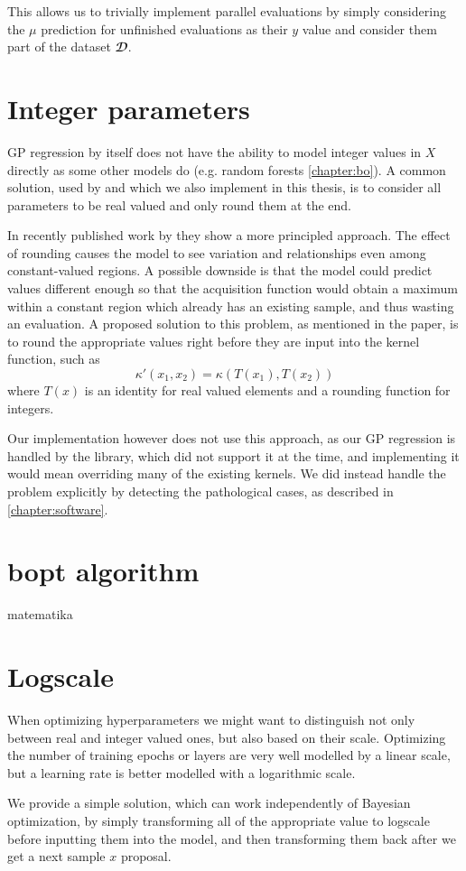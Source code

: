 This allows us to trivially implement parallel evaluations by simply
considering the $μ$ prediction for unfinished evaluations as their $y$ value
and consider them part of the dataset $𝓓$.


\section{Integer parameters}

GP regression by itself does not have the ability to model integer values in $X$ directly as some other models do (e.g. random forests \autoref{chapter:bo}). A common solution, used by \citep{spearmint} and which we also implement in this thesis, is to consider all parameters to be real valued and only round them at the end.

In recently published work by \cite{integer-valued-gp} they show a more principled approach. The effect of rounding causes the model to see variation and relationships even among constant-valued regions. A possible downside is that the model could predict values different enough so that the acquisition function would obtain a maximum within a constant region which already has an existing sample, and thus wasting an evaluation. A proposed solution to this problem, as mentioned in the paper, is to round the appropriate values right before they are input into the kernel function, such as
$$\kappa'(x_1, x_2) = \kappa(T(x_1), T(x_2))$$ where $T(x)$ is an identity for real valued elements and a rounding function for integers.

Our implementation however does not use this approach, as our GP regression is handled by the \cite{gpy2014} library, which did not support it at the time, and implementing it would mean overriding many of the existing kernels. We did instead handle the problem explicitly by detecting the pathological cases, as described in \autoref{chapter:software}.


\section{bopt algorithm}

matematika

\section{Logscale}

When optimizing hyperparameters we might want to distinguish not only between real and integer valued ones, but also based on their scale. Optimizing the number of training epochs or layers are very well modelled by a linear scale, but a learning rate is better modelled with a logarithmic scale.

We provide a simple solution, which can work independently of Bayesian optimization, by simply transforming all of the appropriate value to logscale before inputting them into the model, and then transforming them back after we get a next sample $x$ proposal.


